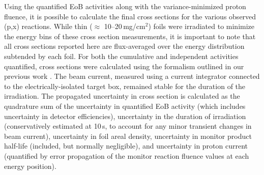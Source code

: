 Using the quantified EoB activities along with the variance-minimized proton fluence, it is possible to calculate the final cross sections for the various observed (p,x) reactions.
While thin ($\approx$ 10--20\,mg/cm$^2$)  foils were irradiated to minimize the energy bins of these cross section measurements, it is important to note that all cross sections reported here are flux-averaged  
over the energy distribution subtended by each foil.
For both the cumulative and independent activities quantified, cross sections were calculated using the formalism outlined in our previous work \cite{Voyles2018a}.
The beam current, measured using a current integrator connected to the electrically-isolated target box, remained stable for the duration of the irradiation.
The propagated uncertainty in cross section is calculated as the quadrature sum of the uncertainty in quantified EoB activity (which includes uncertainty in detector efficiencies), uncertainty in the duration of irradiation (conservatively estimated at 10\,s, to account for any minor transient changes in beam current), uncertainty in foil areal density, uncertainty in monitor product half-life (included, but normally negligible),  and uncertainty in proton current (quantified by error propagation of the monitor reaction fluence values  at each energy position).




